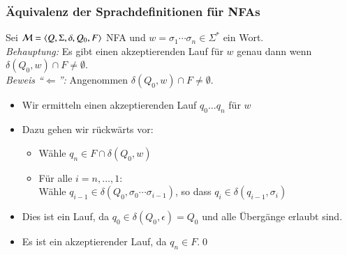 \documentclass[onlymath]{beamer}
\begin{document}
\begin{frame}[t]\frametitle{Äquivalenz der Sprachdefinitionen für NFAs}

Sei $\mathcal{M}=\langle{Q,\Sigma,\delta,Q_0,F}\rangle$ NFA und $w=\sigma_1\cdots\sigma_n\in\Sigma^*$ ein Wort.\\[1ex]

\emph{Behauptung:} Es gibt einen akzeptierenden Lauf für $w$ genau dann wenn
$\delta(Q_0,w)\cap F \neq \emptyset$.\\[1ex]

\emph{Beweis "`$\Leftarrow$"':}
Angenommen $\delta(Q_0,w)\cap F \neq \emptyset$.\pause
\begin{itemize}
\item Wir ermitteln einen akzeptierenden Lauf $q_0\ldots q_n$ für $w$\pause
\item Dazu gehen wir rückwärts vor:
\begin{itemize}
\item Wähle $q_n\in F\cap\delta(Q_0,w)$
\item Für alle $i=n,\ldots,1$:\\
Wähle $q_{i-1}\in\delta(Q_0,\sigma_0\cdots\sigma_{i-1})$, so dass $q_i\in\delta(q_{i-1},\sigma_i) $ 
\end{itemize}\pause
\item Dies ist ein Lauf, da $q_0\in\delta(Q_0,\epsilon)=Q_0$ und alle Übergänge erlaubt sind.
\item Es ist ein akzeptierender Lauf, da $q_n\in F$.\qed
\end{itemize}
\end{frame}
\end{document}

